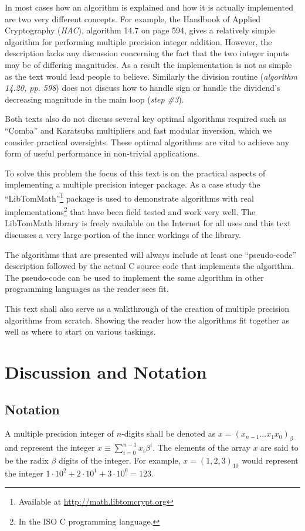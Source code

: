 \documentclass[b5paper]{book}
\begin{document}
In most cases how an algorithm is explained and how it is actually implemented are two very different concepts.  For 
example, the Handbook of Applied Cryptography (\textit{HAC}), algorithm 14.7 on page 594, gives a relatively simple 
algorithm for performing multiple precision integer addition.  However, the description lacks any discussion concerning 
the fact that the two integer inputs may be of differing magnitudes.  As a result the implementation is not as simple
as the text would lead people to believe.  Similarly the division routine (\textit{algorithm 14.20, pp. 598}) does not 
discuss how to handle sign or handle the dividend's decreasing magnitude in the main loop (\textit{step \#3}).

Both texts also do not discuss several key optimal algorithms required such as ``Comba'' and Karatsuba multipliers 
and fast modular inversion, which we consider practical oversights.  These optimal algorithms are vital to achieve 
any form of useful performance in non-trivial applications.  

To solve this problem the focus of this text is on the practical aspects of implementing a multiple precision integer
package.  As a case study the ``LibTomMath''\footnote{Available at \url{http://math.libtomcrypt.org}} package is used 
to demonstrate algorithms with real implementations\footnote{In the ISO C programming language.} that have been field 
tested and work very well.  The LibTomMath library is freely available on the Internet for all uses and this text 
discusses a very large portion of the inner workings of the library.

The algorithms that are presented will always include at least one ``pseudo-code'' description followed 
by the actual C source code that implements the algorithm.  The pseudo-code can be used to implement the same 
algorithm in other programming languages as the reader sees fit.  

This text shall also serve as a walkthrough of the creation of multiple precision algorithms from scratch.  Showing
the reader how the algorithms fit together as well as where to start on various taskings.  

\section{Discussion and Notation}
\subsection{Notation}
A multiple precision integer of $n$-digits shall be denoted as $x = (x_{n-1} ... x_1 x_0)_{ \beta }$ and represent
the integer $x \equiv \sum_{i=0}^{n-1} x_i\beta^i$.  The elements of the array $x$ are said to be the radix $\beta$ digits 
of the integer.  For example, $x = (1,2,3)_{10}$ would represent the integer 
$1\cdot 10^2 + 2\cdot10^1 + 3\cdot10^0 = 123$.  
\end{document}
